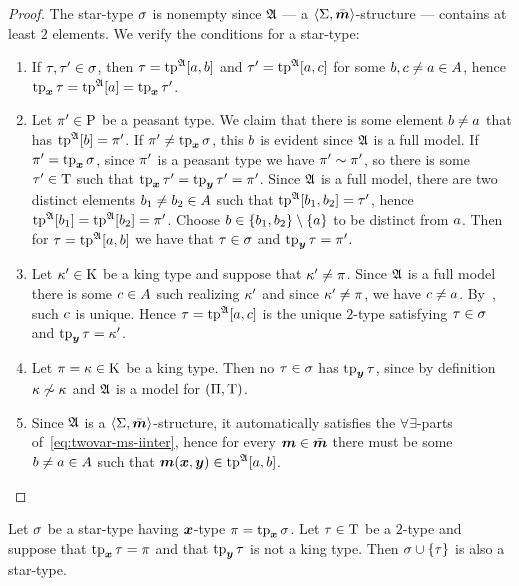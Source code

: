 \begin{proof}
The star-type $\sigma$ is nonempty since $\mathfrak{A}$ --- a
$\left\langle \mathrm{\Sigma},\bar{\bm{m}} \right\rangle$-structure --- contains at least $2$ elements. We verify the
conditions for a star-type:
\begin{enumerate}
  \item If $\tau, {\tau'} \in \sigma$, then $\tau = \operatorname{tp}^{\mathfrak{A}}[a,b]$ and
  ${\tau'} = \operatorname{tp}^{\mathfrak{A}}[a,c]$ for some $b,c\neq a\in A$, hence
  $\operatorname{tp}_{\bm{x}}\tau = \operatorname{tp}^{\mathfrak{A}}[a] = \operatorname{tp}_{\bm{x}}{\tau'}$.
  \item Let ${\pi'}\in\mathrm{P}$ be a peasant type. We claim that there is some
  element $b \neq a$ that has $\operatorname{tp}^{\mathfrak{A}}[b] = {\pi'}$. If ${\pi'} \neq
  \operatorname{tp}_{\bm{x}}\sigma$, this $b$ is evident since $\mathfrak{A}$ is a full model.
  If ${\pi'} = \operatorname{tp}_{\bm{x}}\sigma$, since ${\pi'}$ is a peasant type we have
  ${\pi'}\sim{\pi'}$, so there is some ${\tau'} \in \mathrm{T}$ such that $\operatorname{tp}_{\bm{x}}{\tau'}
  = \operatorname{tp}_{\bm{y}}{\tau'} = {\pi'}$. Since $\mathfrak{A}$ is a full model, there are two distinct
  elements $b_{1} \neq b_{2} \in A$ such that $\operatorname{tp}^{\mathfrak{A}}[b_{1},b_{2}] =
  {\tau'}$, hence $\operatorname{tp}^{\mathfrak{A}}[b_{1}] = \operatorname{tp}^{\mathfrak{A}}[b_{2}] = {\pi'}$. Choose $b
  \in \left\{b_{1},b_{2}\right\}\setminus\left\{a\right\}$ to be distinct from $a$. Then for $\tau
  = \operatorname{tp}^{\mathfrak{A}}[a,b]$ we have that $\tau \in \sigma$ and $\operatorname{tp}_{\bm{y}}\tau = {\pi'}$.
  \item Let ${\kappa'}\in\mathrm{K}$ be a king type and suppose that ${\kappa'} \neq \pi$.
  Since $\mathfrak{A}$ is a full model there is some $c\in A$ such realizing
  ${\kappa'}$ and since ${\kappa'}\neq\pi$, we have $c \neq a$.
  By~, such $c$ is unique. Hence $\tau =
  \operatorname{tp}^{\mathfrak{A}}[a,c]$ is the unique $2$-type satisfying $\tau\in\sigma$ and
  $\operatorname{tp}_{\bm{y}}\tau = {\kappa'}$.
  \item Let $\pi = \kappa \in \mathrm{K}$ be a king type. Then no $\tau\in\sigma$ has
  $\operatorname{tp}_{\bm{y}}\tau$, since by definition $\kappa\not\sim\kappa$ and $\mathfrak{A}$ is a model
  for $(\Pi,\mathrm{T})$.
  \item Since $\mathfrak{A}$ is a $\left\langle \mathrm{\Sigma},\bar{\bm{m}} \right\rangle$-structure, it automatically
  satisfies the $\forall\exists$-parts of~\cref{eq:twovar-ms-iinter}, hence for 
  every $\bm{m} \in \bar{\bm{m}}$ there must be some $b \neq a \in A$ such that
  $\bm{m}(\bm{x},\bm{y}) \in \operatorname{tp}^{\mathfrak{A}}[a,b]$.
\end{enumerate}
\end{proof}

\begin{remark}\label{rem:star-type-ext}
Let $\sigma$ be a star-type having $\bm{x}$-type $\pi = \operatorname{tp}_{\bm{x}}\sigma$.
Let $\tau \in \mathrm{T}$ be a $2$-type and suppose that $\operatorname{tp}_{\bm{x}}\tau = \pi$ and
that $\operatorname{tp}_{\bm{y}}\tau$ is not a king type.
Then $\sigma \cup \left\{\tau\right\}$ is also a star-type.
\end{remark}

